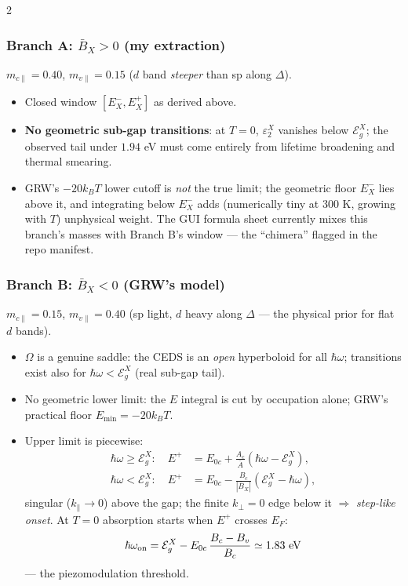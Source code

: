 \documentclass[11pt,a4paper]{article}
\numberwithin{equation}{section}
\newcommand{\hw}{\hbar\omega}
\newcommand{\EgX}{\mathcal{E}_g^{X}}
\newcommand{\Ab}{\bar{A}}
\newcommand{\Bb}{\bar{B}}
\newcommand{\kperp}{k_{\perp}}
\newcommand{\kpar}{k_{\parallel}}
\newcommand{\eps}{\varepsilon}
\newcommand{\Ezc}{E_{0c}}
\newcommand{\kB}{k_B}
\begin{document}
\begin{paracol}{2}
\begin{leftcolumn}
\subsubsection*{Branch A: $\Bb_X>0$ (my extraction)}
$m_{c\parallel}=0.40$, $m_{v\parallel}=0.15$
($d$ band \emph{steeper} than sp along $\Delta$).

\begin{itemize}
\item Closed window $[E^-_X,E^+_X]$ as derived above.
\item \textbf{No geometric sub-gap transitions}: at $T=0$,
      $\eps_2^X$ vanishes below $\EgX$; the observed tail under
      $1.94$ eV must come entirely from lifetime broadening and
      thermal smearing.
\item GRW's $-20\kB T$ lower cutoff is \emph{not} the true limit; the
      geometric floor $E^-_X$ lies above it, and integrating below
      $E^-_X$ adds (numerically tiny at 300 K, growing with $T$)
      unphysical weight.  The GUI formula sheet currently
      mixes this branch's masses with Branch B's window ---
      the ``chimera'' flagged in the repo manifest.
\end{itemize}
\end{leftcolumn}

\begin{rightcolumn}
\subsubsection*{Branch B: $\Bb_X<0$ (GRW's model)}
$m_{c\parallel}=0.15$, $m_{v\parallel}=0.40$
(sp light, $d$ heavy along $\Delta$ --- the physical prior for flat
$d$ bands).

\begin{itemize}
\item $\Omega$ is a genuine saddle: the CEDS is an \emph{open}
      hyperboloid for all $\hw$; transitions exist also for
      $\hw<\EgX$ (real sub-gap tail).
\item No geometric lower limit: the $E$ integral is cut by occupation
      alone; GRW's practical floor $E_{\min}=-20\kB T$.
\item Upper limit is piecewise:
      \begin{align*}
      \hw\ge\EgX:\quad E^{+}&=\Ezc+\tfrac{A_c}{\Ab}(\hw-\EgX),\\
      \hw<\EgX:\quad E^{+}&=\Ezc-\tfrac{B_c}{|\Bb_X|}(\EgX-\hw),
      \end{align*}
      singular ($\kpar\!\to\!0$) above the gap; the finite
      $\kperp\!=\!0$ edge below it $\Rightarrow$ \emph{step-like
      onset}.  At $T=0$ absorption starts when $E^+$ crosses $E_F$:
      \[
      \hw_{\rm on}=\EgX-\Ezc\,\frac{B_c-B_v}{B_c}\simeq1.83\ \text{eV}
      \]
      --- the piezomodulation threshold.
\end{itemize}
\end{rightcolumn}
\end{paracol}
\end{document}
